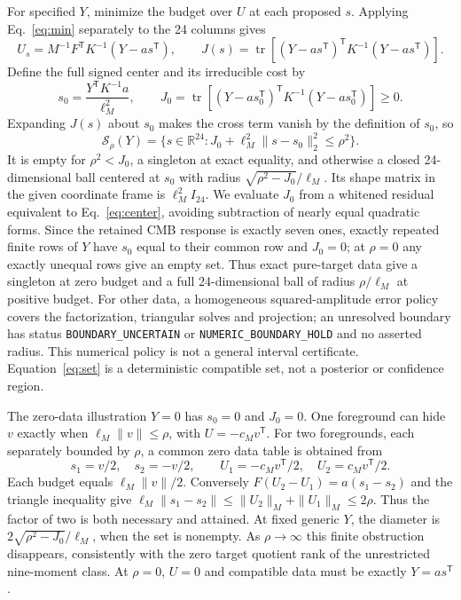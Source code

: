\documentclass[aps,prd,onecolumn,11pt,nofootinbib,notitlepage]{revtex4-2}
\begin{document}
For specified $Y$, minimize the budget over $U$ at each proposed $s$. Applying Eq.~\eqref{eq:min} separately to the 24 columns gives
\begin{equation}
 U_s=M^{-1}F^{\mathsf T}K^{-1}(Y-a s^{\mathsf T}),\qquad
 J(s)=\operatorname{tr}\left[(Y-a s^{\mathsf T})^{\mathsf T}K^{-1}(Y-a s^{\mathsf T})\right].
 \label{eq:conditional}
\end{equation}
Define the full signed center and its irreducible cost by
\begin{equation}
 s_0=\frac{Y^{\mathsf T}K^{-1}a}{\ell_M^2},\qquad
 J_0=\operatorname{tr}\left[(Y-a s_0^{\mathsf T})^{\mathsf T}K^{-1}(Y-a s_0^{\mathsf T})\right]\ge0.
 \label{eq:center}
\end{equation}
Expanding $J(s)$ about $s_0$ makes the cross term vanish by the definition of $s_0$, so
\begin{equation}
 \boxed{\mathcal S_\rho(Y)=\{s\in\mathbb R^{24}:J_0+\ell_M^2\|s-s_0\|_2^2\le\rho^2\}.}
 \label{eq:set}
\end{equation}
It is empty for $\rho^2<J_0$, a singleton at exact equality, and otherwise a closed 24-dimensional ball centered at $s_0$ with radius $\sqrt{\rho^2-J_0}/\ell_M$. Its shape matrix in the given coordinate frame is $\ell_M^2 I_{24}$. We evaluate $J_0$ from a whitened residual equivalent to Eq.~\eqref{eq:center}, avoiding subtraction of nearly equal quadratic forms. Since the retained CMB response is exactly seven ones, exactly repeated finite rows of $Y$ have $s_0$ equal to their common row and $J_0=0$; at $\rho=0$ any exactly unequal rows give an empty set. Thus exact pure-target data give a singleton at zero budget and a full 24-dimensional ball of radius $\rho/\ell_M$ at positive budget. For other data, a homogeneous squared-amplitude error policy covers the factorization, triangular solves and projection; an unresolved boundary has status \texttt{BOUNDARY\_UNCERTAIN} or \texttt{NUMERIC\_BOUNDARY\_HOLD} and no asserted radius. This numerical policy is not a general interval certificate. Equation~\eqref{eq:set} is a deterministic compatible set, not a posterior or confidence region.

The zero-data illustration $Y=0$ has $s_0=0$ and $J_0=0$. One foreground can hide $v$ exactly when $\ell_M\|v\|\le\rho$, with $U=-c_Mv^{\mathsf T}$. For two foregrounds, each separately bounded by $\rho$, a common zero data table is obtained from
\begin{equation}
 s_1=v/2,\quad s_2=-v/2,\qquad
 U_1=-c_Mv^{\mathsf T}/2,\quad U_2=c_Mv^{\mathsf T}/2.
 \label{eq:pair}
\end{equation}
Each budget equals $\ell_M\|v\|/2$. Conversely $F(U_2-U_1)=a(s_1-s_2)$ and the triangle inequality give $\ell_M\|s_1-s_2\|\le\|U_2\|_M+\|U_1\|_M\le2\rho$. Thus the factor of two is both necessary and attained. At fixed generic $Y$, the diameter is $2\sqrt{\rho^2-J_0}/\ell_M$, when the set is nonempty. As $\rho\to\infty$ this finite obstruction disappears, consistently with the zero target quotient rank of the unrestricted nine-moment class. At $\rho=0$, $U=0$ and compatible data must be exactly $Y=a s^{\mathsf T}$.
\end{document}
